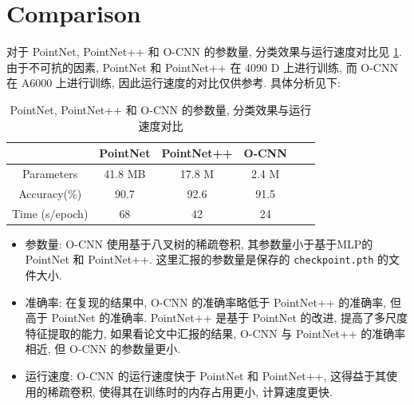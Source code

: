 \documentclass[11pt]{article}
\newcommand\1{\mathds{1}}
\begin{document}
\section{Comparison}
对于 PointNet, PointNet++ 和 O-CNN 的参数量, 分类效果与运行速度对比见 \cref{tab:compare}. 
由于不可抗的因素, PointNet 和 PointNet++ 在 4090 D 上进行训练, 而 O-CNN 在 A6000 上进行训练, 
因此运行速度的对比仅供参考. 具体分析见下: 
\begin{table}[htbp]
    \centering
    \begin{tabular}{cccccc}
    \toprule
    & \textbf{PointNet} & \textbf{PointNet++} & \textbf{O-CNN}  \\
    \midrule
    Parameters & 41.8 MB & 17.8 M & 2.4 M\\
    Accuracy(\%) & 90.7 & 92.6 & 91.5\\
    Time (s/epoch) & 68 & 42 & 24 \\
    \bottomrule
\end{tabular}
    \caption{PointNet, PointNet++ 和 O-CNN 的参数量, 分类效果与运行速度对比}
    \label{tab:compare}
\end{table}

\begin{itemize}
    \item 参数量: O-CNN 使用基于八叉树的稀疏卷积, 其参数量小于基于MLP的 PointNet 和 PointNet++. 这里汇报的参数量是保存的 \texttt{checkpoint.pth} 的文件大小. 
    \item 准确率: 在复现的结果中, O-CNN 的准确率略低于 PointNet++ 的准确率, 但高于 PointNet 的准确率. PointNet++ 是基于 PointNet 的改进, 提高了多尺度特征提取的能力, 
    如果看论文中汇报的结果, O-CNN 与 PointNet++ 的准确率相近, 但 O-CNN 的参数量更小.
    \item 运行速度: O-CNN 的运行速度快于 PointNet 和 PointNet++, 这得益于其使用的稀疏卷积, 使得其在训练时的内存占用更小, 计算速度更快.
\end{itemize}
 
 
\end{document}
